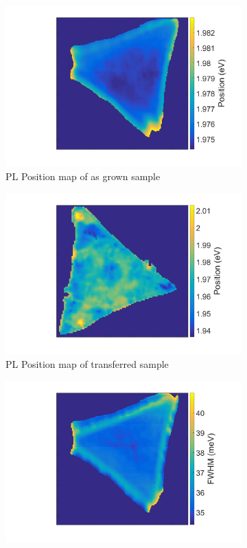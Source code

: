 \begin{figure}[H]
\begin{center}
\begin{subfigure}[b]{0.4\textwidth}
			\includegraphics[scale=0.15]{Transfer/TransferPLPositionMapAsgrown.png}
			\caption{PL Position map of as grown sample}
			\label{fig:TransferPLPositionMapAsgrown}
		\end{subfigure}
		\quad
		\begin{subfigure}[b]{0.4\textwidth}
			\includegraphics[scale=0.15]{Transfer/TransferPLPositionMapTransferred.png}
			\caption{PL Position map of transferred sample}
			\label{fig:TransferPLPositionMapTransferred}
		\end{subfigure}
		\vfill
		\begin{subfigure}[b]{0.4\textwidth}
			\includegraphics[scale=0.15]{Transfer/TransferPLWidthMapAsgrown.png}

\end{subfigure}
\end{center}
\end{figure}
